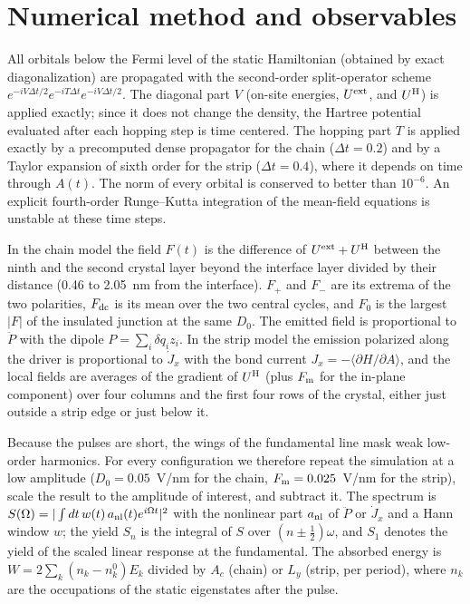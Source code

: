 \documentclass[aps,prl,onecolumn,superscriptaddress,notitlepage]{revtex4-2}
\begin{document}
\section{Numerical method and observables}
All orbitals below the Fermi level of the static Hamiltonian (obtained by exact diagonalization)
are propagated with the second-order split-operator scheme
$e^{-iV\Delta t/2}e^{-iT\Delta t}e^{-iV\Delta t/2}$. The diagonal part $V$ (on-site energies,
$U^{\rm ext}$, and $U^{\rm H}$) is applied exactly; since it does not change the density, the
Hartree potential evaluated after each hopping step is time centered. The hopping part $T$ is
applied exactly by a precomputed dense propagator for the chain ($\Delta t=0.2$) and by a Taylor
expansion of sixth order for the strip ($\Delta t=0.4$), where it depends on time through $A(t)$.
The norm of every orbital is conserved to better than $10^{-6}$. An explicit fourth-order
Runge--Kutta integration of the mean-field equations is unstable at these time steps.

In the chain model the field $F(t)$ is the difference of $U^{\rm ext}+U^{\rm H}$ between the ninth
and the second crystal layer beyond the interface layer divided by their distance (0.46 to 2.05~nm
from the interface). $F_+$ and $F_-$ are its extrema of the two polarities, $F_{\rm dc}$ is its mean
over the two central cycles, and $F_0$ is the largest $|F|$ of the insulated junction at the same
$D_0$. The emitted field is proportional to $\ddot P$ with the dipole $P=\sum_i\delta q_iz_i$. In the
strip model the emission polarized along the driver is proportional to $\dot J_x$ with the bond
current $J_x=-\langle\partial H/\partial A\rangle$, and the local fields are averages of the gradient
of $U^{\rm H}$ (plus $F_{\rm m}$ for the in-plane component) over four columns and the first four
rows of the crystal, either just outside a strip edge or just below it.

Because the pulses are short, the wings of the fundamental line mask weak low-order harmonics. For
every configuration we therefore repeat the simulation at a low amplitude ($D_0=0.05$~V/nm for the
chain, $F_{\rm m}=0.025$~V/nm for the strip), scale the result to the amplitude of interest, and
subtract it. The spectrum is $S(\Omega)=|\int dt\,w(t)\,a_{\rm nl}(t)e^{i\Omega t}|^2$ with the
nonlinear part $a_{\rm nl}$ of $\ddot P$ or $\dot J_x$ and a Hann window $w$; the yield $S_n$ is the
integral of $S$ over $(n\pm\tfrac12)\omega$, and $S_1$ denotes the yield of the scaled linear
response at the fundamental. The absorbed energy is $W=2\sum_k(n_k-n_k^0)E_k$ divided by $A_c$
(chain) or $L_y$ (strip, per period), where $n_k$ are the occupations of the static eigenstates
after the pulse.
\end{document}
